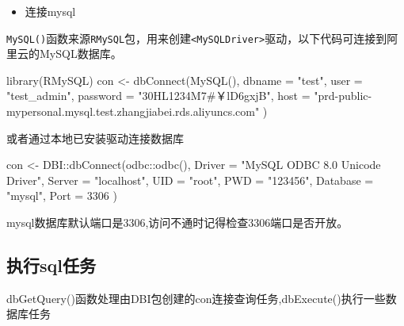 \documentclass[
]{book}
\newenvironment{Shaded}{\begin{snugshade}}{\end{snugshade}}
\newcommand{\AttributeTok}[1]{\textcolor[rgb]{0.77,0.63,0.00}{#1}}
\newcommand{\DecValTok}[1]{\textcolor[rgb]{0.00,0.00,0.81}{#1}}
\newcommand{\FunctionTok}[1]{\textcolor[rgb]{0.00,0.00,0.00}{#1}}
\newcommand{\NormalTok}[1]{#1}
\newcommand{\OtherTok}[1]{\textcolor[rgb]{0.56,0.35,0.01}{#1}}
\newcommand{\SpecialCharTok}[1]{\textcolor[rgb]{0.00,0.00,0.00}{#1}}
\newcommand{\StringTok}[1]{\textcolor[rgb]{0.31,0.60,0.02}{#1}}
\providecommand{\tightlist}{%
  \setlength{\itemsep}{0pt}\setlength{\parskip}{0pt}}
\begin{document}
\begin{itemize}
\tightlist
\item
  连接mysql
\end{itemize}

\texttt{MySQL()}函数来源\texttt{RMySQL}包，用来创建\texttt{\textless{}MySQLDriver\textgreater{}}驱动，以下代码可连接到阿里云的MySQL数据库。

\begin{Shaded}
\begin{Highlighting}[]
\FunctionTok{library}\NormalTok{(RMySQL)}
\NormalTok{con }\OtherTok{\textless{}{-}} \FunctionTok{dbConnect}\NormalTok{(}\FunctionTok{MySQL}\NormalTok{(),}
  \AttributeTok{dbname =} \StringTok{"test"}\NormalTok{, }\AttributeTok{user =} \StringTok{"test\_admin"}\NormalTok{, }\AttributeTok{password =} \StringTok{"30HL1234M7\#￥lD6gxjB"}\NormalTok{,}
  \AttributeTok{host =} \StringTok{"prd{-}public{-}mypersonal.mysql.test.zhangjiabei.rds.aliyuncs.com"}
\NormalTok{)}
\end{Highlighting}
\end{Shaded}

或者通过本地已安装驱动连接数据库

\begin{Shaded}
\begin{Highlighting}[]
\NormalTok{con }\OtherTok{\textless{}{-}}\NormalTok{ DBI}\SpecialCharTok{::}\FunctionTok{dbConnect}\NormalTok{(odbc}\SpecialCharTok{::}\FunctionTok{odbc}\NormalTok{(),}
  \AttributeTok{Driver =} \StringTok{"MySQL ODBC 8.0 Unicode Driver"}\NormalTok{,}
  \AttributeTok{Server =} \StringTok{"localhost"}\NormalTok{, }\AttributeTok{UID =} \StringTok{"root"}\NormalTok{, }\AttributeTok{PWD =} \StringTok{"123456"}\NormalTok{, }\AttributeTok{Database =} \StringTok{"mysql"}\NormalTok{,}
  \AttributeTok{Port =} \DecValTok{3306}
\NormalTok{)}
\end{Highlighting}
\end{Shaded}

mysql数据库默认端口是3306,访问不通时记得检查3306端口是否开放。

\hypertarget{ux6267ux884csqlux4efbux52a1}{%
\subsection{执行sql任务}\label{ux6267ux884csqlux4efbux52a1}}

dbGetQuery()函数处理由DBI包创建的con连接查询任务,dbExecute()执行一些数据库任务
\end{document}
